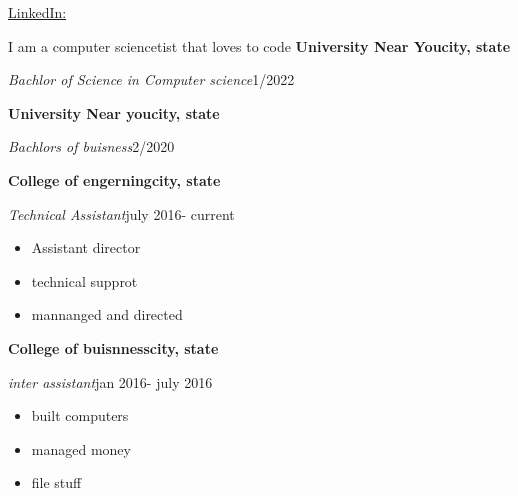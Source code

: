 \documentclass[11pt]{article}%
\begin{document}
%
\normalsize%
%
\location{}%
\begin{center}%
\href{mailto:email@domain}{}%
\vspace*{0.1cm}%
%
\vspace*{0.1cm}%
\href{https://www.linkedin.com/in/}{LinkedIn: }%
\end{center}%
%
I am a computer sciencetist that loves to code%
%
\textbf{University Near You}{\textbf{\hfill {city, state}}}%
\par%
\textit{Bachlor of Science in Computer science}{\hfill {1/2022}}%
\par%
\textbf{University Near you}{\textbf{\hfill {city, state}}}%
\par%
\textit{Bachlors of buisness}{\hfill {2/2020}}%
\par%
%
\textbf{College of engerning}{\textbf{\hfill{city, state}}}%
\par%
\textit{Technical Assistant}{\hfill{july 2016{-} current}}%
\begin{itemize}%
\item%
Assistant director%
\item%
technical supprot%
\item%
mannanged and directed%
\end{itemize}%
\textbf{College of buisnness}{\textbf{\hfill{city, state}}}%
\par%
\textit{inter assistant}{\hfill{jan 2016{-} july 2016}}%
\begin{itemize}%
\item%
built computers%
\item%
managed money%
\item%
file stuff%
\end{itemize}%
%
%
%
%
\resumesection{}%
%
\end{document}
